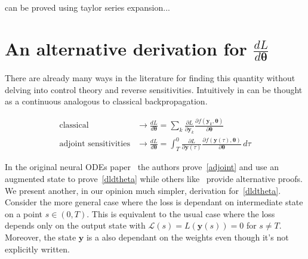\documentclass{article}
\begin{document}
    can be proved using taylor series expansion...


    \section{An alternative derivation for $\frac{dL}{d \pmb{\theta}}$}
    \label{adjoint_proof}
    There are already many ways in the literature for finding this quantity without delving into control theory and reverse sensitivities.
    Intuitively in can be thought as a continuous analogous to classical backpropagation.

    \begin{align}
        \text{classical} &\to
        \frac{d L}{ d \pmb{\theta}} =
        \sum_k
        \frac{\partial L}{\partial \pmb{y}_{k}}
        \frac{\partial f(\pmb{y}_k, \pmb\theta)}{\partial \pmb{\theta}}
        \\
        \text{adjoint sensitivities} &\to
        \frac{d L}{ d \pmb{\theta}} =
        \int_T^0
        \frac{\partial L}{\partial \pmb{y}(\tau)}
        \frac{\partial f(\pmb{y}(\tau), \pmb{\theta})}{\partial \pmb{\theta}} \, d\tau
    \end{align}

    In the original neural ODEs paper~\cite{chen2018neural} the authors prove~\eqref{adjoint} and use an augmented state to prove~\eqref{dldtheta} while others like~\cite{kidger2022neural} provide alternative proofs.
    We present another, in our opinion much simpler, derivation for~\eqref{dldtheta}.
    Consider the more general case where the loss is dependant on intermediate state on a point $s \in (0,T)$.
    This is equivalent to the usual case where the loss depends only on the output state with $\mathcal{L}(s) = L(\pmb{y}(s))=0$ for $s\neq T$.
    Moreover, the state $\pmb{y}$ is a also dependant on the weights even though it's not explicitly written.
\end{document}
